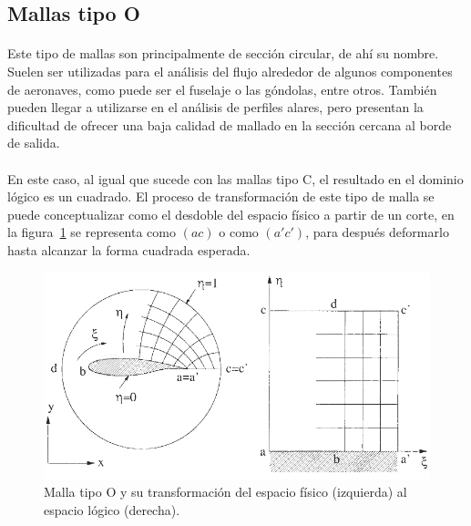 \documentclass[letterpaper, openright, 12pt]{book}
\begin{document}
    \subsection{Mallas tipo O}
    \paragraph*{}
    Este tipo de mallas son principalmente de sección circular, de ahí su
    nombre. Suelen ser utilizadas para el análisis del flujo alrededor de
    algunos componentes de aeronaves, como puede ser el fuselaje o las
    góndolas, entre otros.\cite{vladimir-grid} También pueden llegar a
    utilizarse en el análisis de perfiles alares, pero presentan la
    dificultad de ofrecer una baja calidad de mallado en la sección cercana al
    borde de salida.~\cite{blazek}\cite{best-practices-grid-generation}

    \paragraph*{}
    En este caso, al igual que sucede con las mallas tipo C, el resultado en
    el dominio lógico es un cuadrado. El proceso de transformación de este
    tipo de malla se puede conceptualizar como el desdoble del espacio
    físico a partir de un corte, en la figura~\ref{fig:malla-o} se
    representa como $(ac)$ o como $(a'c')$, para después deformarlo hasta
    alcanzar la forma cuadrada esperada.
    \begin{figure}[htbp!]
        \centering
            \includegraphics[keepaspectratio, width=170mm]{./img/malla-o}
            \captionsetup{justification=centering, margin=2cm}
            \caption[Malla tipo O]{Malla tipo O y su transformación del
            espacio físico (izquierda) al espacio lógico
            (derecha).~\cite{blazek}}
        \label{fig:malla-o}
    \end{figure}
\end{document}
